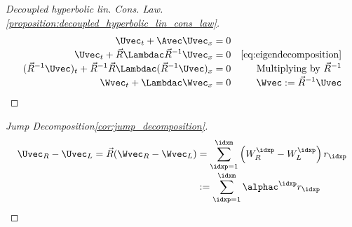 \begin{proofbox}\nospacing
    \begin{proof}[Decoupled hyperbolic lin. Cons. Law.\cref{proposition:decoupled_hyperbolic_lin_cons_law}]\label{proof:proposition:decoupled_hyperbolic_lin_cons_law}
        \begin{align*}
          \Uvec_{t}+\Avec\Uvec_{x}=0&& \\[-1\jot]
          \Uvec_{t}+\vec{R}\Lambdac\vec{R}^{-1}\Uvec_{x}=0&&\Cref{eq:eigendecomposition}\\[-1\jot]
          (\vec{R}^{-1}\Uvec)_{t}+\vec{R}^{-1}\vec{R}\Lambdac(\vec{R}^{-1}\Uvec)_{x}=0&&\text{Multiplying by $\vec{R}^{-1}$}\\[-1\jot]
          \Wvec_{t}+\Lambdac\Wvec_{x}=0&&\Wvec:=\vec{R}^{-1}\Uvec
        \end{align*}
    \end{proof}
\end{proofbox}
\begin{proofbox}\nospacing
    \begin{proof}[Jump Decomposition\cref{cor:jump_decomposition}]\label{proof:cor:jump_decomposition}
        \begin{align*}
          \Uvec_{R}-\Uvec_{L}=\vec{R}(\Wvec_{R}-\Wvec_{L})&=\sum_{\idxp=1}^{\idxm}\left(W_{R}^{\idxp}-W_{L}^{\idxp}\right)r_{\idxp}\nonumber\\[-1\jot]
          &:=\sum_{\idxp=1}^{\idxm}\alphac^{\idxp}r_{\idxp}
        \end{align*}
    \end{proof}
\end{proofbox}

